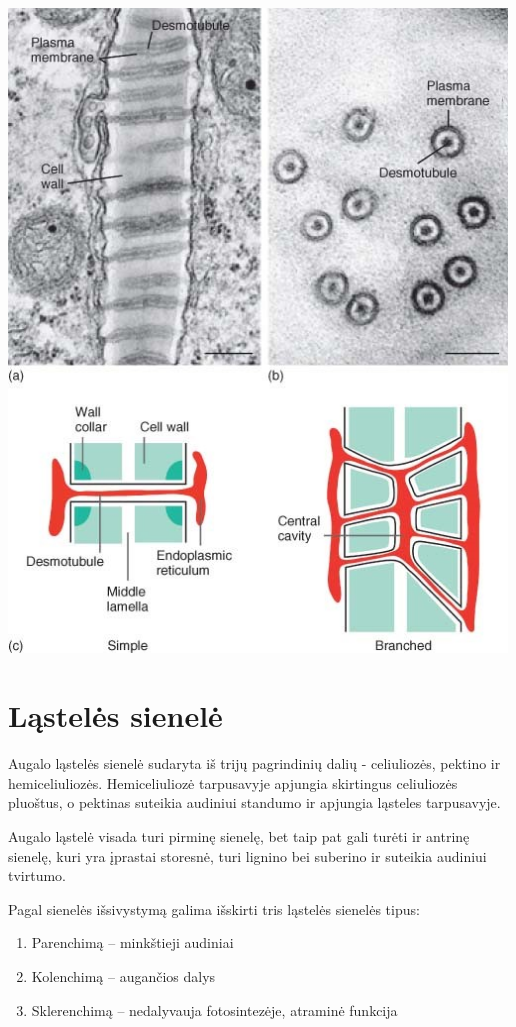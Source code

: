 \documentclass[]{book}
\providecommand{\tightlist}{%
  \setlength{\itemsep}{0pt}\setlength{\parskip}{0pt}}
\begin{document}
\includegraphics[width=500px]{static/augalai/plasmodesmata}

\hypertarget{lasteles-sienele}{%
\section{Ląstelės sienelė}\label{lasteles-sienele}}

Augalo ląstelės sienelė sudaryta iš trijų pagrindinių dalių - celiuliozės, pektino ir hemiceliuliozės. Hemiceliuliozė tarpusavyje apjungia skirtingus celiuliozės pluoštus, o pektinas suteikia audiniui standumo ir apjungia ląsteles tarpusavyje.

Augalo ląstelė visada turi pirminę sienelę, bet taip pat gali turėti ir antrinę sienelę, kuri yra įprastai storesnė, turi lignino bei suberino ir suteikia audiniui tvirtumo.

Pagal sienelės išsivystymą galima išskirti tris ląstelės sienelės tipus:

\begin{enumerate}
\def\labelenumi{\arabic{enumi}.}
\tightlist
\item
  Parenchimą -- minkštieji audiniai
\item
  Kolenchimą -- augančios dalys
\item
  Sklerenchimą -- nedalyvauja fotosintezėje, atraminė funkcija
\end{enumerate}
\end{document}
